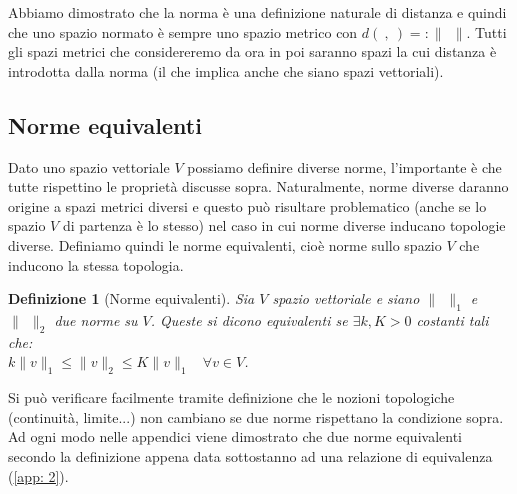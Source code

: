\documentclass[a4paper,12pt]{report}
\newtheorem{definizione}{Definizione}[chapter]
\newcommand{\gt}{>}
\begin{document}
Abbiamo dimostrato che la norma è una definizione naturale di distanza e quindi che uno spazio normato è sempre uno spazio metrico con $d(\ ,\ )=:\|\ \ \|$. Tutti gli spazi metrici che considereremo da ora in poi saranno spazi la cui distanza è introdotta dalla norma (il che implica anche che siano spazi vettoriali).

\subsection{Norme equivalenti}

Dato uno spazio vettoriale $V$ possiamo definire diverse norme, l'importante è che tutte rispettino le proprietà discusse sopra. Naturalmente, norme diverse daranno origine a spazi metrici diversi e questo può risultare problematico (anche se lo spazio $V$ di partenza è lo stesso) nel caso in cui norme diverse inducano topologie diverse. Definiamo quindi le norme equivalenti, cioè norme sullo spazio $V$ che inducono la stessa topologia.

\begin{definizione}[Norme equivalenti]
    Sia $V$ spazio vettoriale e siano $\| \ \ \|_1$ e $\| \ \ \|_2$ due norme su $V$. Queste si dicono equivalenti se $\exists k,K \gt0$ costanti tali che: 
    \\$k\|v\|_1\leq\|v\|_2\leq K\|v\|_1 \ \  \ \ \forall v \in V$.
\end{definizione}

Si può verificare facilmente tramite definizione che le nozioni topologiche (continuità, limite...) non cambiano se due norme rispettano la condizione sopra. Ad ogni modo nelle appendici viene dimostrato che due norme equivalenti secondo la definizione appena data sottostanno ad una relazione di equivalenza (\ref{app: 2}).

\newpage
\end{document}
